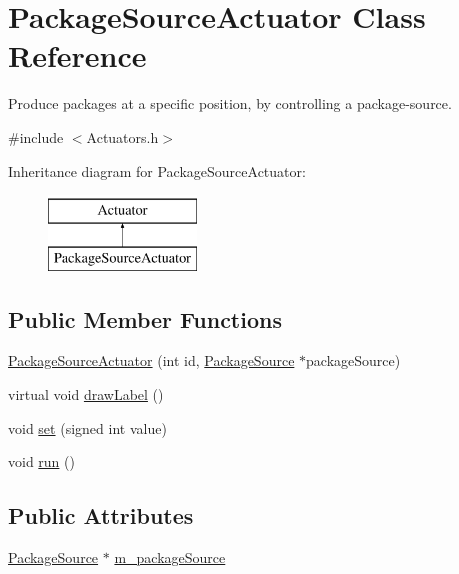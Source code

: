 \hypertarget{classPackageSourceActuator}{\section{Package\-Source\-Actuator Class Reference}
\label{classPackageSourceActuator}
}


Produce packages at a specific position, by controlling a package-\/source.  




{\ttfamily \#include $<$Actuators.\-h$>$}

Inheritance diagram for Package\-Source\-Actuator\-:\begin{figure}[H]
\begin{center}
\leavevmode
\includegraphics[height=2.000000cm]{classPackageSourceActuator}
\end{center}
\end{figure}
\subsection*{Public Member Functions}
\begin{DoxyCompactItemize}
\item 
\hyperlink{classPackageSourceActuator_a8be44f996eef9829a49d0cef77db033e}{Package\-Source\-Actuator} (int id, \hyperlink{classPackageSource}{Package\-Source} $\ast$package\-Source)
\item 
virtual void \hyperlink{classPackageSourceActuator_ab27c455d40d832ed4558f893f1ed3565}{draw\-Label} ()
\item 
void \hyperlink{classPackageSourceActuator_a67e19fb7457c9c29288d8409446756f0}{set} (signed int value)
\item 
void \hyperlink{classPackageSourceActuator_a058a225a850f0d49a79f90700ada3254}{run} ()
\end{DoxyCompactItemize}
\subsection*{Public Attributes}
\begin{DoxyCompactItemize}
\item 
\hyperlink{classPackageSource}{Package\-Source} $\ast$ \hyperlink{classPackageSourceActuator_a7104c9ab657025a7f245f92f38b27b71}{m\-\_\-package\-Source}
\end{DoxyCompactItemize}



